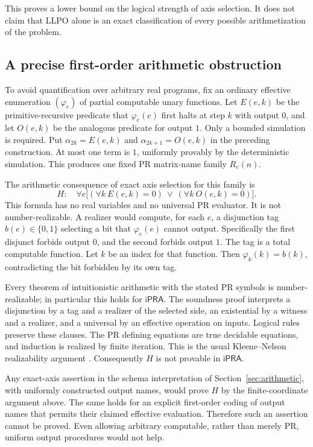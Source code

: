 \documentclass[11pt]{article}
\theoremstyle{definition}\newtheorem{definition}[theorem]{Definition}
\newcommand{\ipra}{\mathsf{iPRA}}
\begin{document}
This proves a lower bound on the logical strength of axis selection.
It does not claim that LLPO alone is an exact classification of every
possible arithmetization of the problem.

\subsection{A precise first-order arithmetic obstruction}
To avoid quantification over arbitrary real programs, fix an ordinary
effective enumeration $(\varphi_e)$ of partial computable unary functions.
Let $E(e,k)$ be the primitive-recursive predicate that $\varphi_e(e)$
first halts at step $k$ with output $0$, and let $O(e,k)$ be the analogous
predicate for output $1$. Only a bounded simulation is required.
Put $\alpha_{2k}=E(e,k)$ and $\alpha_{2k+1}=O(e,k)$ in the preceding
construction. At most one term is $1$, uniformly provably by the
deterministic simulation. This produces one fixed PR matrix-name family
$R_e(n)$.

The arithmetic consequence of exact axis selection for this family is
\begin{equation}\label{eq:H}
 H:\quad\forall e\bigl[(\forall k\ E(e,k)=0)\ \vee\
                          (\forall k\ O(e,k)=0)\bigr].
\end{equation}
This formula has no real variables and no universal PR evaluator.
It is not number-realizable. A realizer would compute, for each $e$, a
disjunction tag $b(e)\in\{0,1\}$ selecting a bit that
$\varphi_e(e)$ cannot output. Specifically the first disjunct forbids
output $0$, and the second forbids output $1$. The tag is a total
computable function. Let $k$ be an index for that function. Then
$\varphi_k(k)=b(k)$, contradicting the bit forbidden by its own tag.

Every theorem of intuitionistic arithmetic with the stated PR symbols
is number-realizable; in particular this holds for $\ipra$. The soundness
proof interprets a disjunction by a tag and a realizer of the selected
side, an existential by a witness and a realizer, and a universal by an
effective operation on inputs. Logical rules preserve these clauses.
The PR defining equations are true decidable equations, and induction
is realized by finite iteration. This is the usual Kleene--Nelson
realizability argument \cite{kleene,moschovakis}. Consequently $H$ is
not provable in $\ipra$.

Any exact-axis assertion in the schema interpretation of
Section~\ref{sec:arithmetic}, with uniformly constructed output names,
would prove $H$ by the finite-coordinate argument above. The same
holds for an explicit first-order coding of output names that permits
their claimed effective evaluation. Therefore such an assertion cannot
be proved. Even allowing arbitrary computable, rather than merely PR,
uniform output procedures would not help.
\end{document}

